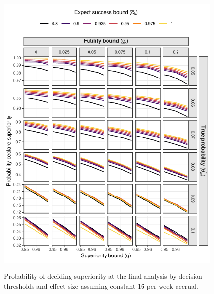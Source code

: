 \documentclass{bmcart}
\begin{document}
\begin{figure}[!ht]
	\caption{Probability of deciding superiority at the final analysis by decision thresholds and effect size assuming constant 16 per week accrual.}
	\includegraphics{superiority_16.pdf}
	\label{fig:superiority_16}
\end{figure}
\end{document}
